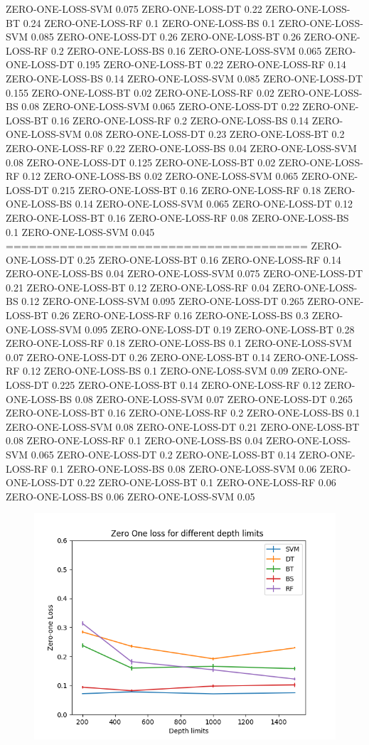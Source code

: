 \documentclass[12pt]{article}
\begin{document}
ZERO-ONE-LOSS-SVM 0.075
ZERO-ONE-LOSS-DT 0.22
ZERO-ONE-LOSS-BT 0.24
ZERO-ONE-LOSS-RF 0.1
ZERO-ONE-LOSS-BS 0.1
ZERO-ONE-LOSS-SVM 0.085
ZERO-ONE-LOSS-DT 0.26
ZERO-ONE-LOSS-BT 0.26
ZERO-ONE-LOSS-RF 0.2
ZERO-ONE-LOSS-BS 0.16
ZERO-ONE-LOSS-SVM 0.065
ZERO-ONE-LOSS-DT 0.195
ZERO-ONE-LOSS-BT 0.22
ZERO-ONE-LOSS-RF 0.14
ZERO-ONE-LOSS-BS 0.14
ZERO-ONE-LOSS-SVM 0.085
ZERO-ONE-LOSS-DT 0.155
ZERO-ONE-LOSS-BT 0.02
ZERO-ONE-LOSS-RF 0.02
ZERO-ONE-LOSS-BS 0.08
ZERO-ONE-LOSS-SVM 0.065
ZERO-ONE-LOSS-DT 0.22
ZERO-ONE-LOSS-BT 0.16
ZERO-ONE-LOSS-RF 0.2
ZERO-ONE-LOSS-BS 0.14
ZERO-ONE-LOSS-SVM 0.08
ZERO-ONE-LOSS-DT 0.23
ZERO-ONE-LOSS-BT 0.2
ZERO-ONE-LOSS-RF 0.22
ZERO-ONE-LOSS-BS 0.04
ZERO-ONE-LOSS-SVM 0.08
ZERO-ONE-LOSS-DT 0.125
ZERO-ONE-LOSS-BT 0.02
ZERO-ONE-LOSS-RF 0.12
ZERO-ONE-LOSS-BS 0.02
ZERO-ONE-LOSS-SVM 0.065
ZERO-ONE-LOSS-DT 0.215
ZERO-ONE-LOSS-BT 0.16
ZERO-ONE-LOSS-RF 0.18
ZERO-ONE-LOSS-BS 0.14
ZERO-ONE-LOSS-SVM 0.065
ZERO-ONE-LOSS-DT 0.12
ZERO-ONE-LOSS-BT 0.16
ZERO-ONE-LOSS-RF 0.08
ZERO-ONE-LOSS-BS 0.1
ZERO-ONE-LOSS-SVM 0.045
=======================================
ZERO-ONE-LOSS-DT 0.25
ZERO-ONE-LOSS-BT 0.16
ZERO-ONE-LOSS-RF 0.14
ZERO-ONE-LOSS-BS 0.04
ZERO-ONE-LOSS-SVM 0.075
ZERO-ONE-LOSS-DT 0.21
ZERO-ONE-LOSS-BT 0.12
ZERO-ONE-LOSS-RF 0.04
ZERO-ONE-LOSS-BS 0.12
ZERO-ONE-LOSS-SVM 0.095
ZERO-ONE-LOSS-DT 0.265
ZERO-ONE-LOSS-BT 0.26
ZERO-ONE-LOSS-RF 0.16
ZERO-ONE-LOSS-BS 0.3
ZERO-ONE-LOSS-SVM 0.095
ZERO-ONE-LOSS-DT 0.19
ZERO-ONE-LOSS-BT 0.28
ZERO-ONE-LOSS-RF 0.18
ZERO-ONE-LOSS-BS 0.1
ZERO-ONE-LOSS-SVM 0.07
ZERO-ONE-LOSS-DT 0.26
ZERO-ONE-LOSS-BT 0.14
ZERO-ONE-LOSS-RF 0.12
ZERO-ONE-LOSS-BS 0.1
ZERO-ONE-LOSS-SVM 0.09
ZERO-ONE-LOSS-DT 0.225
ZERO-ONE-LOSS-BT 0.14
ZERO-ONE-LOSS-RF 0.12
ZERO-ONE-LOSS-BS 0.08
ZERO-ONE-LOSS-SVM 0.07
ZERO-ONE-LOSS-DT 0.265
ZERO-ONE-LOSS-BT 0.16
ZERO-ONE-LOSS-RF 0.2
ZERO-ONE-LOSS-BS 0.1
ZERO-ONE-LOSS-SVM 0.08
ZERO-ONE-LOSS-DT 0.21
ZERO-ONE-LOSS-BT 0.08
ZERO-ONE-LOSS-RF 0.1
ZERO-ONE-LOSS-BS 0.04
ZERO-ONE-LOSS-SVM 0.065
ZERO-ONE-LOSS-DT 0.2
ZERO-ONE-LOSS-BT 0.14
ZERO-ONE-LOSS-RF 0.1
ZERO-ONE-LOSS-BS 0.08
ZERO-ONE-LOSS-SVM 0.06
ZERO-ONE-LOSS-DT 0.22
ZERO-ONE-LOSS-BT 0.1
ZERO-ONE-LOSS-RF 0.06
ZERO-ONE-LOSS-BS 0.06
ZERO-ONE-LOSS-SVM 0.05

\begin{figure}
	\centering
	\includegraphics{Analysis3.png}
\end{figure}
\end{document}
